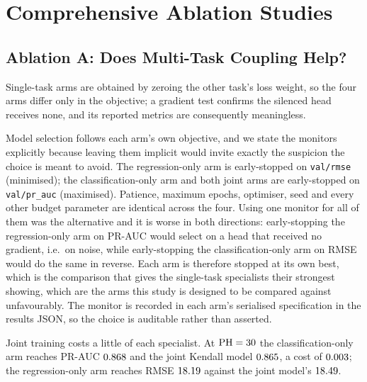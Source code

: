 \section{Comprehensive Ablation Studies}
\label{app:ablations}

\subsection{Ablation A: Does Multi-Task Coupling Help?}
\label{sec:ablation_a}



Single-task arms are obtained by zeroing the other task's loss weight, so the
four arms differ only in the objective; a gradient test confirms the silenced
head receives none, and its reported metrics are consequently meaningless.

Model selection follows each arm's own objective, and we state the monitors
explicitly because leaving them implicit would invite exactly the suspicion the
choice is meant to avoid. The regression-only arm is early-stopped on
\texttt{val/rmse} (minimised); the classification-only arm and both joint arms
are early-stopped on \texttt{val/pr\_auc} (maximised). Patience, maximum epochs,
optimiser, seed and every other budget parameter are identical across the four.
Using one monitor for all of them was the alternative and it is worse in both
directions: early-stopping the regression-only arm on PR-AUC would select on a
head that received no gradient, i.e.\ on noise, while early-stopping the
classification-only arm on RMSE would do the same in reverse. Each arm is
therefore stopped at its own best, which is the comparison that gives the
single-task specialists their strongest showing, which are the arms this study is
designed to be compared against unfavourably. The monitor is recorded in each arm's serialised
specification in the results JSON, so the choice is auditable rather than
asserted.

Joint training costs a little of each specialist. At $\mathrm{PH} = 30$ the
classification-only arm reaches PR-AUC $0.868$ and the joint
Kendall model $0.865$, a cost of
$0.003$; the regression-only arm reaches RMSE
$18.19$ against the joint model's
$18.49$.

